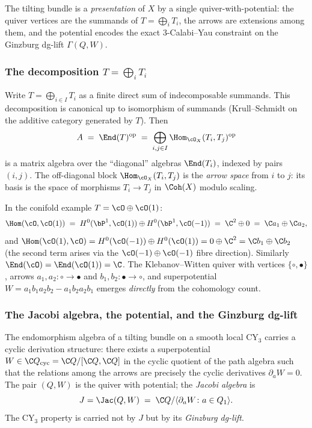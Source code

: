 The tilting bundle is a \emph{presentation} of $X$ by a single
quiver-with-potential: the quiver vertices are the summands of
$T = \bigoplus_i T_i$, the arrows are extensions among them, and the potential
encodes the exact $3$-Calabi--Yau constraint on the Ginzburg dg-lift
$\Gamma(Q, W)$.

\subsubsection{The decomposition $T = \bigoplus_i T_i$}

Write $T = \bigoplus_{i \in I} T_i$ as a finite direct sum of indecomposable
summands. This decomposition is canonical up to isomorphism of summands
(Krull--Schmidt on the additive category generated by $T$). Then
\[
 A \;=\; \End(T)^{\mathrm{op}} \;=\; \bigoplus_{i, j \in I}
 \Hom_{\cO_X}(T_i, T_j)^{\mathrm{op}}
\]
is a matrix algebra over the ``diagonal'' algebras $\End(T_i)$, indexed by
pairs $(i,j)$. The off-diagonal block $\Hom_{\cO_X}(T_i, T_j)$ is the
\emph{arrow space} from $i$ to $j$: its basis is the space of morphisms
$T_i \to T_j$ in $\Coh(X)$ modulo scaling.

In the conifold example $T = \cO \oplus \cO(1)$:
\[
 \Hom(\cO, \cO(1)) \;=\; H^{0}(\bP^1, \cO(1)) \oplus H^{0}(\bP^1, \cO(-1))
 \;=\; \C^{2} \oplus 0 \;=\; \C a_1 \oplus \C a_2,
\]
and $\Hom(\cO(1), \cO) = H^0(\cO(-1)) \oplus H^0(\cO(1)) = 0 \oplus \C^{2}
= \C b_1 \oplus \C b_2$ (the second term arises via the $\cO(-1) \oplus
\cO(-1)$ fibre direction). Similarly $\End(\cO) = \End(\cO(1)) = \C$. The
Klebanov--Witten quiver with vertices $\{\circ, \bullet\}$, arrows $a_1, a_2
\colon \circ \to \bullet$ and $b_1, b_2 \colon \bullet \to \circ$, and
superpotential $W = a_1 b_1 a_2 b_2 - a_1 b_2 a_2 b_1$ emerges \emph{directly}
from the cohomology count.

\subsubsection{The Jacobi algebra, the potential, and the Ginzburg dg-lift}

The endomorphism algebra of a tilting bundle on a smooth local CY$_3$ carries
a cyclic derivation structure: there exists a superpotential
$W \in \C Q_{\mathrm{cyc}} = \C Q / [\C Q, \C Q]$ in the cyclic quotient of
the path algebra such that the relations among the arrows are precisely the
cyclic derivatives $\partial_a W = 0$. The pair $(Q, W)$ is the quiver with
potential; the \emph{Jacobi algebra} is
\[
 J = \Jac(Q, W) \;=\; \C Q / \langle \partial_a W \colon a \in Q_1 \rangle.
\]
The CY$_3$ property is carried not by $J$ but by its \emph{Ginzburg dg-lift}.

